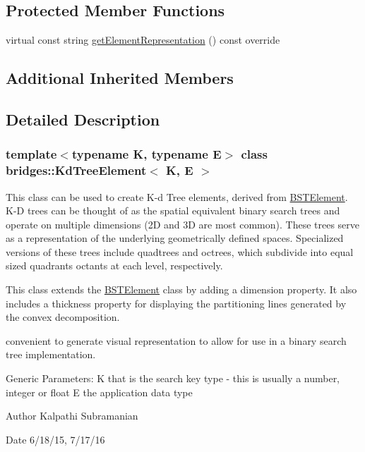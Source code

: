 \subsection*{Protected Member Functions}
\begin{DoxyCompactItemize}
\item 
virtual const string \mbox{\hyperlink{classbridges_1_1_kd_tree_element_ad8aa2d89689f33691063fee9c601e2cb}{get\+Element\+Representation}} () const override
\end{DoxyCompactItemize}
\subsection*{Additional Inherited Members}


\subsection{Detailed Description}
\subsubsection*{template$<$typename K, typename E$>$\newline
class bridges\+::\+Kd\+Tree\+Element$<$ K, E $>$}

This class can be used to create K-\/d Tree elements, derived from \mbox{\hyperlink{classbridges_1_1_b_s_t_element}{B\+S\+T\+Element}}. K-\/D trees can be thought of as the spatial equivalent binary search trees and operate on multiple dimensions (2D and 3D are most common). These trees serve as a representation of the underlying geometrically defined spaces. Specialized versions of these trees include quadtrees and octrees, which subdivide into equal sized quadrants octants at each level, respectively. 

This class extends the \mbox{\hyperlink{classbridges_1_1_b_s_t_element}{B\+S\+T\+Element}} class by adding a dimension property. It also includes a thickness property for displaying the partitioning lines generated by the convex decomposition.

convenient to generate visual representation to allow for use in a binary search tree implementation.

Generic Parameters\+: K that is the search key type -\/ this is usually a number, integer or float E the application data type

\begin{DoxyAuthor}{Author}
Kalpathi Subramanian 
\end{DoxyAuthor}
\begin{DoxyDate}{Date}
6/18/15, 7/17/16 
\end{DoxyDate}


